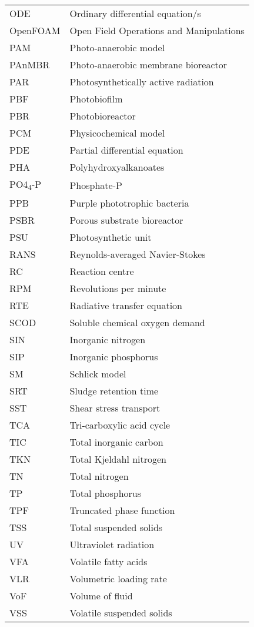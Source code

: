 \begin{center}
\begin{longtable}{ll}
ODE	&	Ordinary differential equation/s	\\
OpenFOAM	&	Open Field Operations and Manipulations	\\
PAM	&	Photo-anaerobic model	\\
PAnMBR	&	Photo-anaerobic membrane bioreactor	\\
PAR	&	Photosynthetically active radiation	\\
PBF	&	Photobiofilm	\\
PBR	&	Photobioreactor	\\
PCM	&	Physicochemical model	\\
PDE	&	Partial differential equation	\\
PHA	&	Polyhydroxyalkanoates	\\
PO4\textsubscript{4}-P	&	Phosphate-P	\\
PPB	&	Purple phototrophic bacteria	\\
PSBR	&	Porous substrate bioreactor	\\
PSU	&	Photosynthetic unit	\\
RANS	&	Reynolds-averaged Navier-Stokes	\\
RC	&	Reaction centre	\\
RPM	&	Revolutions per minute	\\
RTE	&	Radiative transfer equation	\\
SCOD	&	Soluble chemical oxygen demand	\\
SIN	&	Inorganic nitrogen	\\
SIP	&	Inorganic phosphorus	\\
SM	&	Schlick model	\\
SRT	&	Sludge retention time	\\
SST	&	Shear stress transport	\\
TCA	&	Tri-carboxylic acid cycle	\\
TIC	&	Total inorganic carbon	\\
TKN	&	Total Kjeldahl nitrogen	\\
TN	&	Total nitrogen	\\
TP	&	Total phosphorus	\\
TPF	&	Truncated phase function	\\
TSS	&	Total suspended solids	\\
UV	&	Ultraviolet radiation	\\
VFA	&	Volatile fatty acids	\\
VLR	&	Volumetric loading rate	\\
VoF	&	Volume of fluid	\\
VSS	&	Volatile suspended solids	\\
	\hline
	\end{longtable}
\end{center}

